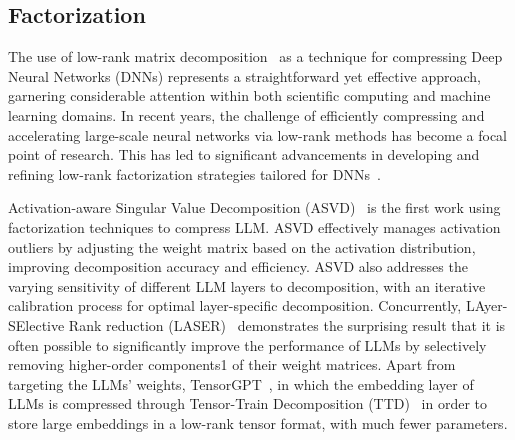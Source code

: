 \subsection{Factorization}
The use of low-rank matrix decomposition~\citep{kishore2017literature} as a technique for compressing Deep Neural Networks (DNNs) represents a straightforward yet effective approach, garnering considerable attention within both scientific computing and machine learning domains. In recent years, the challenge of efficiently compressing and accelerating large-scale neural networks via low-rank methods has become a focal point of research. This has led to significant advancements in developing and refining low-rank factorization strategies tailored for DNNs~\citep{schotthofer2022low}. 

Activation-aware Singular Value Decomposition (ASVD)~\citep{yuan2023asvd} is the first work using factorization techniques to compress LLM. 
ASVD effectively manages activation outliers by adjusting the weight matrix based on the activation distribution, improving decomposition accuracy and efficiency. ASVD also addresses the varying sensitivity of different LLM layers to decomposition, with an iterative calibration process for optimal layer-specific decomposition.
Concurrently, LAyer-SElective Rank reduction (LASER)~\citep{sharma2023truth} demonstrates the surprising result that it is often possible to significantly improve the performance of LLMs by selectively removing higher-order components1 of their weight matrices. 
Apart from targeting the LLMs' weights, TensorGPT~\citep{xu2023tensorgpt}, in which the embedding layer of LLMs is compressed through Tensor-Train Decomposition (TTD)~\citep{oseledets2011tensor} in order to store large embeddings in a low-rank tensor format, with much fewer parameters. 
